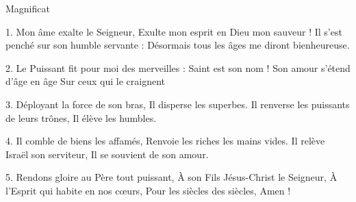 Magnificat

1. Mon âme exalte le Seigneur,
Exulte mon esprit en Dieu mon sauveur !
Il s'est penché sur son humble servante :
Désormais tous les âges me diront bienheureuse.

2. Le Puissant fit pour moi des merveilles :
Saint est son nom !
Son amour s'étend d'âge en âge
Sur ceux qui le craignent

3. Déployant la force de son bras,
Il disperse les superbes.
Il renverse les puissants de leurs trônes,
Il élève les humbles.

4. Il comble de biens les affamés,
Renvoie les riches les mains vides.
Il relève Israël son serviteur,
Il se souvient de son amour.

5. Rendons gloire au Père tout puissant,
À son Fils Jésus-Christ le Seigneur,
À l'Esprit qui habite en nos cœurs,
Pour les siècles des siècles, Amen !
